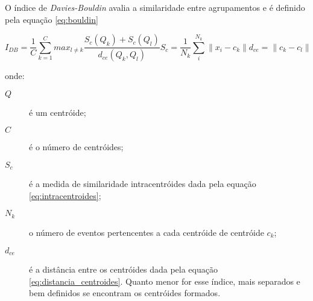 O índice de \emph{Davies-Bouldin} avalia a similaridade entre
agrupamentos e é definido pela equação \ref{eq:bouldin}

\begin{subequations}
\begin{equation}
\label{eq:bouldin}
I_{DB} = \frac{1}{C}\sum_{k=1}^{C}max_{l\neq
k}{\frac{S_{c}(Q_{k})+S_{c}(Q_{l})}{d_{ce}(Q_{k},Q_{l})}}
\end{equation}
\begin{equation} \label{eq:intracentroides}
S_{c} = \frac{1}{N_{k}}\sum_{i}^{N_{k}}\|x_{i}-c_{k}\|
\end{equation}
\begin{equation} \label{eq:distancia_centroides}
d_{ce} = \|c_{k}-c_{l}\|
\end{equation}
\end{subequations}

\noindent onde: 

\begin{description}
\item [$Q$] é um centróide; 
\item [$C$] é o número de centróides; 
\item [$S_{c}$] é a medida de similaridade intracentróides dada pela equação
\ref{eq:intracentroides};
\item [$N_{k}$] o número de eventos pertencentes a cada centróide de
centróide $c_{k}$;
\item [$d_{ce}$] é a distância entre os
centróides dada pela equação \ref{eq:distancia_centroides}. Quanto
menor for esse índice, mais separados e bem definidos se encontram os
centróides formados.
\end{description}

